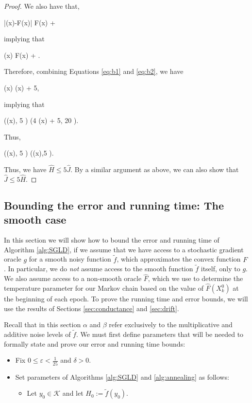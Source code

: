 \documentclass[final,12pt]{colt2018} %
\def \be{\begin{equs}}
\def \ee{\end{equs}}
\begin{document}
{\begin{proof}
\noindent We also have that,
 \be
 |(x)-F(x)| \leq \alpha F(x) + \beta
 \ee
implying that
 \be \label{eq:b2}
 (x)  F(x) + \beta.
 \ee
Therefore, combining Equations \eqref{eq:b1} and \eqref{eq:b2}, we have
\be \label{eq:b3}
 (x)  (x) + 5\beta,
 \ee
implying that
\be
 \max((x), 5 \beta) \leq \max(4 (x) + 5\beta, 20 \beta).\\
 \ee
 Thus,
 \be
 \max((x), 5 \beta) \max((x),5 \beta).
\ee
Thus, we have $\hat{H}\leq 5\hat{J}$.  By a similar argument as above, we can also show that $\hat{J} \leq 5\hat{H}$.
\end{proof}


\subsection{Bounding the error and running time: The smooth case}
 \label{sec:result_smooth}

In this section we will show how to bound the error and running time of Algorithm \ref{alg:SGLD}, if we assume that we have access to a stochastic gradient oracle  $g$ for a smooth noisy function $\tilde{f}$, which approximates the convex function $F$.  In particular, we do \emph{not} assume access to the smooth function $\tilde{f}$ itself, only to $g$.  We also assume access to a non-smooth oracle $\hat{F}$, which we use to determine the temperature parameter for our Markov chain based on the value of $\hat{F}(X_k^{0})$ at the beginning of each epoch.  To prove the running time and error bounds, we will use the results of Sections \ref{sec:conductance} and \ref{sec:drift}.

Recall that in this section $\alpha$ and $\beta$ refer exclusively to the multiplicative and additive noise levels of $\tilde{f}$.
  We must first define parameters that will be needed to formally state and prove our error and running time bounds:




\begin{itemize}
\item Fix $0\leq \varepsilon < \frac{1}{25}$ and $\delta>0$.  

\item Set parameters of Algorithms \ref{alg:SGLD} and \ref{alg:annealing} as follows: 

\begin{itemize}
\item Let $y_0\in \mathcal{K}$ and let $H_0 := \tilde{f}(y_0)$. 


\end{itemize}
\end{itemize}}
\end{document}

